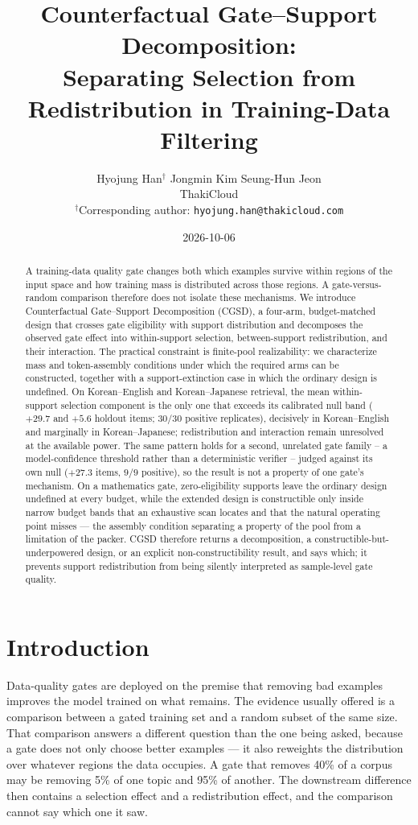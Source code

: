 \documentclass[10pt,twocolumn]{article}
\title{\vspace{-1.2em}Counterfactual Gate--Support Decomposition:\\
Separating Selection from Redistribution in Training-Data Filtering}
\author{Hyojung Han$^{\dagger}$ \qquad Jongmin Kim \qquad Seung-Hun Jeon\\[4pt]
        \small ThakiCloud\\[2pt]
        \small $^{\dagger}$Corresponding author: \texttt{hyojung.han@thakicloud.com}}
\date{2026-10-06}
\begin{document}
\maketitle

\begin{abstract}
A training-data quality gate changes both which examples survive within regions of the input
space and how training mass is distributed across those regions. A gate-versus-random
comparison therefore does not isolate these mechanisms. We introduce Counterfactual
Gate--Support Decomposition (CGSD), a four-arm, budget-matched design that crosses gate
eligibility with support distribution and decomposes the observed gate effect into
within-support selection, between-support redistribution, and their interaction. The practical
constraint is finite-pool realizability: we characterize mass and token-assembly conditions
under which the required arms can be constructed, together with a support-extinction case in
which the ordinary design is undefined. On Korean--English and Korean--Japanese retrieval,
the mean within-support selection component is the only one that exceeds its calibrated null
band ($+29.7$ and $+5.6$ holdout items; $30/30$ positive replicates), decisively in
Korean--English and marginally in Korean--Japanese; redistribution and interaction remain
unresolved at the available power. The same pattern holds for a second, unrelated gate family --
a model-confidence threshold rather than a deterministic verifier -- judged against its own null
($+27.3$ items, $9/9$ positive), so the result is not a property of one gate's mechanism. On a mathematics gate, zero-eligibility supports leave the
ordinary design undefined at every budget, while the extended design is constructible only
inside narrow budget bands that an exhaustive scan locates and that the natural operating point
misses --- the assembly condition separating a property of the pool from a limitation of the
packer. CGSD therefore returns a decomposition, a constructible-but-underpowered design, or an
explicit non-constructibility result, and says which; it prevents support redistribution from
being silently interpreted as sample-level gate quality.
\end{abstract}

\section{Introduction}

Data-quality gates are deployed on the premise that removing bad examples improves the model
trained on what remains. The evidence usually offered is a comparison between a gated training
set and a random subset of the same size. That comparison answers a different question than the
one being asked, because a gate does not only choose better examples --- it also reweights the
distribution over whatever regions the data occupies. A gate that removes 40\% of a corpus may
be removing 5\% of one topic and 95\% of another. The downstream difference then contains a
selection effect and a redistribution effect, and the comparison cannot say which one it saw.
\end{document}
